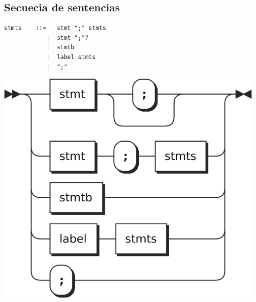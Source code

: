 \subsection{Secuecia de sentencias}
\begin{multicols}{2}
\begin{lstlisting}[style=nonumbers]
stmts    ::=   stmt ";" stmts
            |  stmt ";"?
            |  stmtb 
            |  label stmts
            |  ";"
\end{lstlisting}  	
\columnbreak
\begin{center}
\includegraphics[scale=0.7]{diagram/stmts.png} \\
\end{center}
\end{multicols}
\pagebreak
